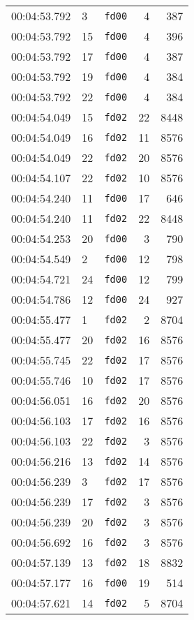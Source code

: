 \documentclass{article}
\begin{document}
\begin{longtable}{lllrr}
00:04:53.792 & 3 & \texttt{fd00} & 4 & 387 \\
00:04:53.792 & 15 & \texttt{fd00} & 4 & 396 \\
00:04:53.792 & 17 & \texttt{fd00} & 4 & 387 \\
00:04:53.792 & 19 & \texttt{fd00} & 4 & 384 \\
00:04:53.792 & 22 & \texttt{fd00} & 4 & 384 \\
00:04:54.049 & 15 & \texttt{fd02} & 22 & 8448 \\
00:04:54.049 & 16 & \texttt{fd02} & 11 & 8576 \\
00:04:54.049 & 22 & \texttt{fd02} & 20 & 8576 \\
00:04:54.107 & 22 & \texttt{fd02} & 10 & 8576 \\
00:04:54.240 & 11 & \texttt{fd00} & 17 & 646 \\
00:04:54.240 & 11 & \texttt{fd02} & 22 & 8448 \\
00:04:54.253 & 20 & \texttt{fd00} & 3 & 790 \\
00:04:54.549 & 2 & \texttt{fd00} & 12 & 798 \\
00:04:54.721 & 24 & \texttt{fd00} & 12 & 799 \\
00:04:54.786 & 12 & \texttt{fd00} & 24 & 927 \\
00:04:55.477 & 1 & \texttt{fd02} & 2 & 8704 \\
00:04:55.477 & 20 & \texttt{fd02} & 16 & 8576 \\
00:04:55.745 & 22 & \texttt{fd02} & 17 & 8576 \\
00:04:55.746 & 10 & \texttt{fd02} & 17 & 8576 \\
00:04:56.051 & 16 & \texttt{fd02} & 20 & 8576 \\
00:04:56.103 & 17 & \texttt{fd02} & 16 & 8576 \\
00:04:56.103 & 22 & \texttt{fd02} & 3 & 8576 \\
00:04:56.216 & 13 & \texttt{fd02} & 14 & 8576 \\
00:04:56.239 & 3 & \texttt{fd02} & 17 & 8576 \\
00:04:56.239 & 17 & \texttt{fd02} & 3 & 8576 \\
00:04:56.239 & 20 & \texttt{fd02} & 3 & 8576 \\
00:04:56.692 & 16 & \texttt{fd02} & 3 & 8576 \\
00:04:57.139 & 13 & \texttt{fd02} & 18 & 8832 \\
00:04:57.177 & 16 & \texttt{fd00} & 19 & 514 \\
00:04:57.621 & 14 & \texttt{fd02} & 5 & 8704 \\

\end{longtable}
\end{document}
